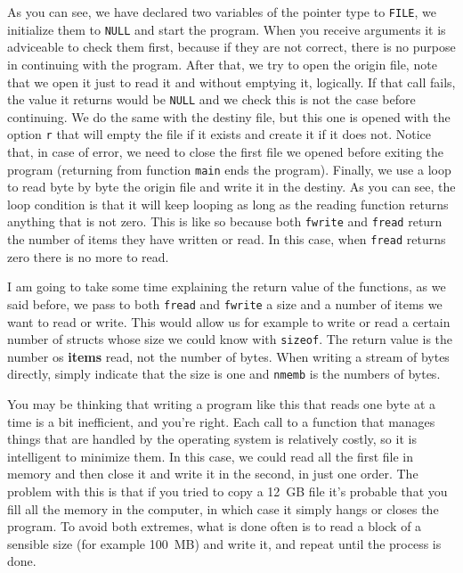 \documentclass[a4paper]{article}
\begin{document}
As you can see, we have declared two variables of the pointer type to
\verb!FILE!, we initialize them to \verb"NULL" and start the program. When you
receive arguments it is adviceable to check them first, because if they are not
correct, there is no purpose in continuing with the program. After that, we try
to open the origin file, note that we open it just to read it and without
emptying it, logically. If that call fails, the value it returns would be
\verb!NULL! and we check this is not the case before continuing. We do the
same with the destiny
file, but this one is opened with the option \verb!r! that will empty the file
if it exists and create it if it does not.
Notice that, in case of error, we need to close the first file we
opened before exiting the program (returning from function \verb!main! ends the
program). Finally, we use a loop to read byte by byte the origin file and write
it in the destiny. As you can see, the loop condition is that it will keep
looping as long as the reading function returns anything that is not zero.
This is like so because both \verb!fwrite! and \verb!fread! return the number of
items they have written or read. In this case, when \verb!fread! returns zero
there is no more to read.

I am going to take some time explaining the return value of the functions, as
we said before, we pass to both \verb!fread! and \verb!fwrite! a size and a
number of items we want to read or write. This would allow us for example to
write or read a certain number of structs whose size we could know with
\verb!sizeof!. The return value is the number os \textbf{items} read, not the
number of bytes. When writing a stream of bytes directly, simply indicate that
the size is one and \verb!nmemb! is the numbers of bytes.

You may be thinking that writing a program like this that reads one byte at a
time is a bit inefficient, and you're right. Each call to a function that
manages things that are handled by the operating system is relatively costly,
so it is intelligent to minimize them. In this case, we could read all the
first file in memory and then close it and write it in the second, in just one
order. The problem with this is that if you tried to copy a 12~GB file it's
probable that you fill all the memory in the computer, in which case it simply
hangs or closes the program. To avoid both extremes, what is done often is to
read a block of a sensible size (for example 100~MB) and write it, and repeat
until the process is done.
\end{document}
